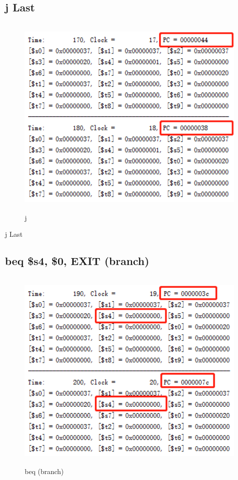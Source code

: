 \documentclass{article}
\begin{document}
\subsection{j Last}
\begin{figure}[H]
    \centering
    \includegraphics[height = 10cm,width = 13cm]{j.png}
    \caption{j}
    \label{fig:my_label}
\end{figure}

j Last

\subsection{beq \$s4, \$0, EXIT (branch)}
\begin{figure}[H]
    \centering
    \includegraphics[height = 10cm,width = 13cm]{beq.png}
    \caption{beq (branch)}
    \label{fig:my_label}
\end{figure}
\end{document}
